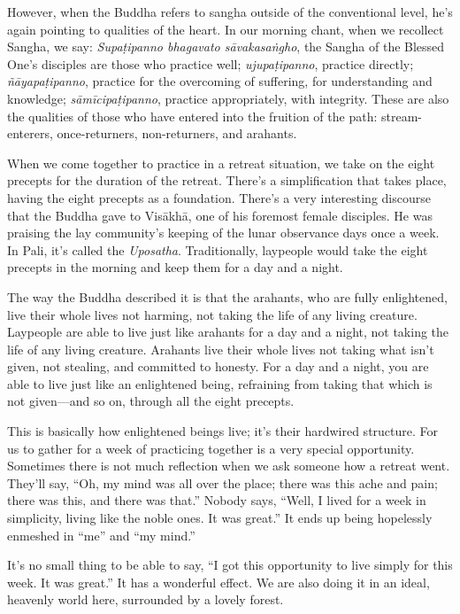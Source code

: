 However, when the Buddha refers to sangha outside of the conventional
level, he’s again pointing to qualities of the heart. In our morning
chant, when we recollect Sangha, we say: \emph{Supaṭipanno bhagavato
sāvakasaṅgho}, the Sangha of the Blessed One’s disciples are those who
practice well; \emph{ujupaṭipanno}, practice directly;
\emph{ñāyapaṭipanno}, practice for the overcoming of suffering, for
understanding and knowledge; \emph{sāmīcipaṭipanno}, practice
appropriately, with integrity. These are also the qualities of those who
have entered into the fruition of the path: stream-enterers,
once-returners, non-returners, and arahants.

When we come together to practice in a retreat situation, we take on the
eight precepts for the duration of the retreat. There’s a simplification
that takes place, having the eight precepts as a foundation. There’s a
very interesting discourse that the Buddha gave to Visākhā, one of his
foremost female disciples. He was praising the lay community’s keeping
of the lunar observance days once a week. In Pali, it’s called the
\emph{Uposatha}. Traditionally, laypeople would take the eight precepts
in the morning and keep them for a day and a night.

The way the Buddha described it is that the arahants, who are fully
enlightened, live their whole lives not harming, not taking the life of
any living creature. Laypeople are able to live just like arahants for a
day and a night, not taking the life of any living creature. Arahants
live their whole lives not taking what isn’t given, not stealing, and
committed to honesty. For a day and a night, you are able to live just
like an enlightened being, refraining from taking that which is not
given—and so on, through all the eight precepts.

This is basically how enlightened beings live; it’s their hardwired
structure. For us to gather for a week of practicing together is a very
special opportunity. Sometimes there is not much reflection when we ask
someone how a retreat went. They’ll say, “Oh, my mind was all over the
place; there was this ache and pain; there was this, and there was
that.” Nobody says, “Well, I lived for a week in simplicity, living like
the noble ones. It was great.” It ends up being hopelessly enmeshed in
“me” and “my mind.”

It’s no small thing to be able to say, “I got this opportunity to live
simply for this week. It was great.” It has a wonderful effect. We are
also doing it in an ideal, heavenly world here, surrounded by a lovely
forest.

